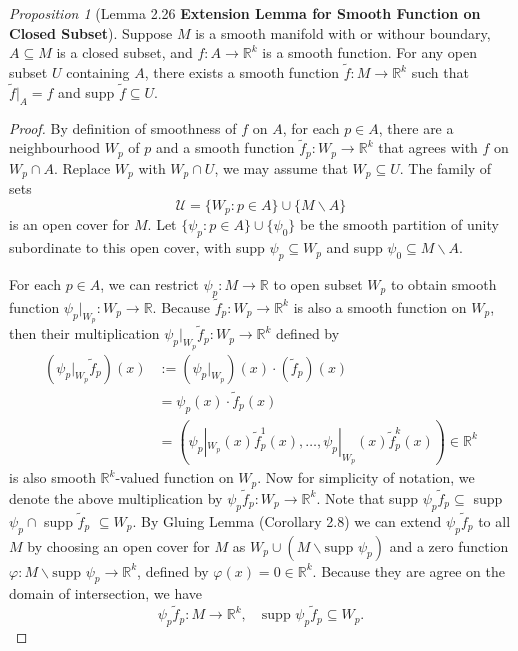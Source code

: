 \documentclass[a4paper]{article}
\theoremstyle{remark}
\newtheorem{prop}{Proposition}
\newcommand{\er}{\mathbb{R}} %
\newcommand{\rk}{\mathbb{R}^k} %
\newcommand{\subhim}{\subseteq} %
\begin{document}
\begin{prop}[Lemma 2.26 \textbf{Extension Lemma for Smooth Function on Closed Subset}] \label{Extend f from A}
Suppose $M$ is a smooth manifold with or withour boundary, $A \subseteq M$ is a closed subset, and $f : A \to \mathbb{R}^k$ is a smooth function. For any open subset $U$ containing $A$, there exists a smooth function $\tilde{f} : M \to \mathbb{R}^k$ such that $\tilde{f}|_A = f$ and supp $\tilde{f} \subseteq U$.
\end{prop}
\begin{proof}
By definition of smoothness of $f$ on $A$, for each $p \in A$, there are a neighbourhood $W_p$ of $p$ and a smooth function $\tilde{f}_p : W_p \to \mathbb{R}^k$ that agrees with $f$ on $W_p \cap A$. Replace $W_p$ with $W_p \cap U$, we may assume that $W_p \subhim U$. The family of sets 
$$
\mathcal{U} = \{W_p : p \in A \} \cup \{ M\smallsetminus A \} 
$$ 
is an open cover for $M$. Let $\{\psi_p : p \in A \} \cup \{\psi_0\}$ be the smooth partition of unity subordinate to this open cover, with supp $\psi_p \subhim W_p$ and supp $\psi_0 \subhim M \smallsetminus A$.

For each $p \in A$, we can restrict $\psi_p : M \to \er$ to open subset $W_p$ to obtain smooth function 
$\psi_p|_{W_p} : W_p \to \er$. Because $\tilde{f}_p : W_p \to \rk$ is also a smooth function on $W_p$, then their multiplication $\psi_p|_{W_p} \tilde{f}_p : W_p \to \rk$ defined by
\begin{align*}
(\psi_p|_{W_p} \tilde{f}_p)(x) &:= (\psi_p|_{W_p})(x) \cdot (\tilde{f}_p)(x) \\ 
&= \psi_p(x) \cdot  \tilde{f}_p(x) \\
&= (\psi_p|_{W_p}(x) \tilde{f}_p^1(x), \dots, \psi_p|_{W_p}(x) \tilde{f}_p^k (x) ) \in \rk
\end{align*}
is also smooth $\rk$-valued function on $W_p$. Now for simplicity of notation, we denote the above multiplication by $\psi_p \tilde{f}_p : W_p \to \rk$. Note that supp $\psi_p \tilde{f}_p \subhim $ supp $\psi_p \cap$ supp $\tilde{f}_p$   $\subhim W_p$. By Gluing Lemma (Corollary 2.8) we can extend $\psi_p \tilde{f}_p$ to all $M$ by choosing an open cover for $M$ as $W_p \cup (M \smallsetminus \text{supp }\psi_p)$ and a zero function $\varphi : M \smallsetminus \text{supp }\psi_p \to \rk$, defined by $\varphi(x) = 0 \in \rk$. Because they are agree on the domain of intersection, we have
$$
\psi_p \tilde{f}_p : M \to \rk, \quad \text{supp }\psi_p \tilde{f}_p \subhim W_p.
$$


\end{proof}
\end{document}
